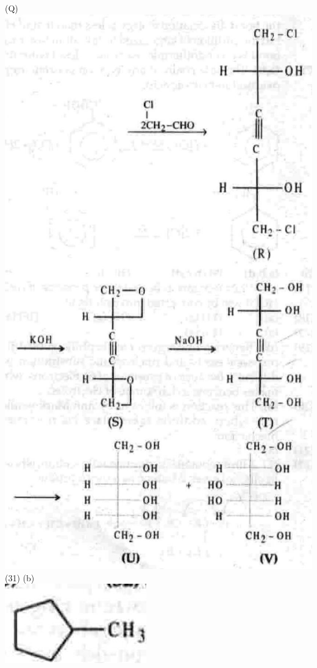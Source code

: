 \documentclass[10pt]{article}
\begin{document}
(Q)\\
\includegraphics[max width=\textwidth, center]{2025_01_28_8470952b98110cec3aabg-246(7)}\\
(31) (b)\\
\includegraphics[max width=\textwidth, center]{2025_01_28_8470952b98110cec3aabg-246}\\
\end{document}
